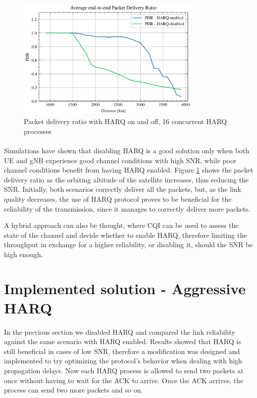 \begin{figure}[ht]
    \centering
    \includegraphics[width=0.8\textwidth]{res/pdr_harq_onoff.png}
    \caption{Packet delivery ratio with \ac{HARQ} on and off, 16 concurrent \ac{HARQ} processes}
    \label{fig:harq-snr}
\end{figure}

\paragraph{}
Simulations have shown that disabling \ac{HARQ} is a good solution only when both \ac{UE} and \ac{gNB} experience good channel conditions with high \ac{SNR}, while poor channel conditions benefit from having \ac{HARQ} enabled. Figure \ref{fig:harq-snr} shows the packet delivery ratio as the orbiting altitude of the satellite increases, thus reducing the SNR. Initially, both scenarios correctly deliver all the packets, but, as the link quality decreases, the use of \ac{HARQ} protocol proves to be beneficial for the reliability of the transmission, since it manages to correctly deliver more packets. 

A hybrid approach can also be thought, where \ac{CQI} can be used to assess the state of the channel and decide whether to enable \ac{HARQ}, therefore limiting the throughput in exchange for a higher reliability, or disabling it, should the \ac{SNR} be high enough.

\section{Implemented solution - Aggressive HARQ}
\paragraph{}
In the previous section we disabled \ac{HARQ} and compared the link reliability against the same scenario with \ac{HARQ} enabled. Results showed that \ac{HARQ} is still beneficial in cases of low \ac{SNR}, therefore a modification was designed and implemented to try optimizing the protocol's behavior when dealing with high propagation delays.
Now each \ac{HARQ} process is allowed to send two packets at once without having to wait for the \ac{ACK} to arrive. Once the \ac{ACK} arrives, the process can send two more packets and so on.

